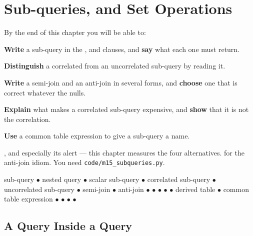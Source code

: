 \chapter{Sub-queries, \texorpdfstring{}{EXISTS} and Set Operations}\label{ch:subqueries}

\begin{outcomes}
By the end of this chapter you will be able to:
\begin{tight}
  \item \textbf{Write} a sub-query in the ,  and
         clauses, and \textbf{say} what each one must return.
  \item \textbf{Distinguish} a correlated from an uncorrelated sub-query by
        reading it.
  \item \textbf{Write} a semi-join and an anti-join in several forms, and
        \textbf{choose} one that is correct whatever the nulls.
  \item \textbf{Explain} what makes a correlated sub-query expensive, and
        \textbf{show} that it is not the correlation.
  \item \textbf{Use} a common table expression to give a sub-query a name.
\end{tight}
\end{outcomes}

\begin{prereq}
, and especially its  alert --- this chapter
measures the four alternatives.  for the anti-join idiom. You
need \texttt{code/m15\_subqueries.py}.
\end{prereq}

\begin{keyterms}
sub-query $\bullet$ nested query $\bullet$ scalar sub-query $\bullet$
correlated sub-query $\bullet$ uncorrelated sub-query $\bullet$ semi-join
$\bullet$ anti-join $\bullet$  $\bullet$  $\bullet$
 $\bullet$  $\bullet$ derived table $\bullet$ common
table expression $\bullet$  $\bullet$  $\bullet$
 $\bullet$ 
\end{keyterms}

\section{A Query Inside a Query}

